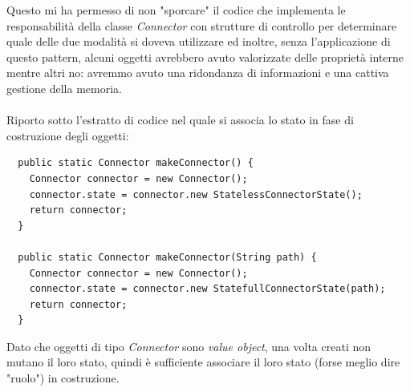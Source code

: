 Questo mi ha permesso di non "sporcare" il codice che implementa le
responsabilit\`a della classe \emph{Connector} con strutture di
controllo per determinare quale delle due modalit\`a si doveva
utilizzare ed inoltre, senza l'applicazione di questo pattern, alcuni
oggetti avrebbero avuto valorizzate delle propriet\`a interne mentre
altri no: avremmo avuto una ridondanza di informazioni e una
cattiva gestione della memoria.
\\\\
Riporto sotto l'estratto di codice nel quale si associa lo stato in
fase di costruzione degli oggetti:
\begin{lstlisting}
  public static Connector makeConnector() {
    Connector connector = new Connector();
    connector.state = connector.new StatelessConnectorState(); 
    return connector; 
  }

  public static Connector makeConnector(String path) { 
    Connector connector = new Connector();
    connector.state = connector.new StatefullConnectorState(path);
    return connector;
  }
\end{lstlisting}
Dato che oggetti di tipo \emph{Connector} sono \emph{value object},
una volta creati non mutano il loro stato, quindi \`e sufficiente
associare il loro stato (forse meglio dire "ruolo") in costruzione.